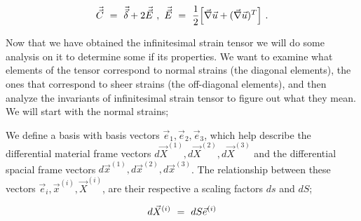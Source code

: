 \documentclass{article}
\begin{document}
\begin{equation} \label{eb-eq-1-79}
\vec{\vec{C}} \hspace{0.125cm} = \hspace{0.125cm} \vec{\vec{\delta}} + 2 \vec{\vec{E}} \hspace{0.125cm} , \hspace{0.125cm} \vec{\vec{E}}  \hspace{0.125cm} = \hspace{0.125cm} \frac{1}{2} \Big[ \vec{\nabla} \vec{u} + ( \vec{\nabla} \vec{u} )^T \Big] \hspace{0.125cm} .
\end{equation} 

Now that we have obtained the infinitesimal strain tensor we will do some analysis on it to determine some if its properties. We want to examine what elements of the tensor correspond to normal strains (the diagonal elements), the ones that correspond to sheer strains (the off-diagonal elements), and then analyze the invariants of infinitesimal strain tensor to figure out what they mean. We will start with the normal strains;

We define a basis with basis vectors \begin{math} \vec{e}_1 ,  \vec{e}_2 ,  \vec{e}_3 \end{math}, which help describe the differential material frame vectors \begin{math} d \vec{X}^{( 1 )} , d \vec{X}^{( 2 )} , d \vec{X}^{( 3 )} \end{math} and the differential spacial frame vectors \begin{math} d \vec{x}^{( 1 )} ,  d \vec{x}^{( 2 )} , d \vec{x}^{( 3 )} \end{math}. The relationship between these vectors \begin{math} \vec{e}_i ,  \vec{x}^{( i )}  ,  \vec{X}^{( i )} \end{math}, are their respective a scaling factors \begin{math} ds \end{math} and \begin{math} dS \end{math};

\begin{equation} \label{eb-eq-1-80}
d \vec{X}^{( i )}  \hspace{0.125cm} = \hspace{0.125cm} dS  \vec{e}^{( i )} 
\end{equation} 
\end{document}
